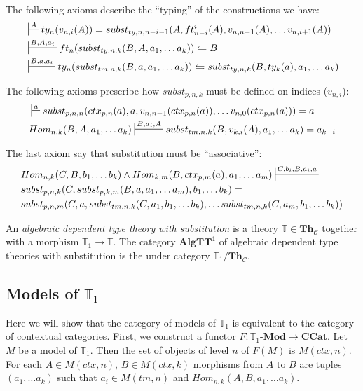 \documentclass{elsarticle}
\theoremstyle{definition}
\theoremstyle{remark}
\newcommand{\cat}[1]{\mathbf{#1}}
\newcommand{\ccat}{\cat{CCat}}
\newcommand{\algtt}{\cat{AlgTT}}
\newcommand{\Mod}[1]{#1\text{-}\cat{Mod}}
\newcommand{\Th}{\cat{Th}}
\newcommand{\ThC}{\Th_{\mathcal{C}}}
\numberwithin{figure}{section}
\begin{document}
The following axioms describe the ``typing'' of the constructions we have:
\begin{align}
\label{ax:type-var}
& \sststile{}{A}         ty_n(v_{n,i}(A)) = subst_{ty,n,n-i-1}(A, ft^i_{n-i}(A), v_{n,n-1}(A), \ldots v_{n,i+1}(A)) \\
\label{ax:type-subst-ty}
& \sststile{}{B, A, a_i} ft_n(subst_{ty,n,k}(B, A, a_1, \ldots a_k)) \leftrightharpoons B \\
\label{ax:type-subst-tm}
& \sststile{}{B, a, a_i} ty_n(subst_{tm,n,k}(B, a, a_1, \ldots a_k)) \leftrightharpoons subst_{ty,n,k}(B, ty_k(a), a_1, \ldots a_k)
\end{align}

The following axioms prescribe how $subst_{p,n,k}$ must be defined on indices ($v_{n,i}$):
\begin{align}
\label{ax:subst-var}
& \sststile{}{a}         subst_{p,n,n}(ctx_{p,n}(a), a, v_{n,n-1}(ctx_{p,n}(a)), \ldots v_{n,0}(ctx_{p,n}(a))) = a \\
\label{ax:var-subst}
& Hom_{n,k}(B, A, a_1, \ldots a_k) \sststile{}{B, a_i, A} subst_{tm,n,k}(B, v_{k,i}(A), a_1, \ldots a_k) = a_{k-i}
\end{align}

The last axiom say that substitution must be ``associative'':
\begin{align}
\label{ax:subst-subst}
& Hom_{n,k}(C, B, b_1, \ldots b_k) \land Hom_{k,m}(B, ctx_{p,m}(a), a_1, \ldots a_m) \sststile{}{C, b_i, B, a_i, a} \\ \notag
& subst_{p,n,k}(C, subst_{p,k,m}(B, a, a_1, \ldots a_m), b_1, \ldots b_k) = \\ \notag
& subst_{p,n,m}(C, a, subst_{tm,n,k}(C, a_1, b_1, \ldots b_k), \ldots subst_{tm,n,k}(C, a_m, b_1, \ldots b_k))
\end{align}

\begin{defn}
An \emph{algebraic dependent type theory with substitution} is a theory $\mathbb{T} \in \ThC$ together with a morphism $\mathbb{T}_1 \to \mathbb{T}$.
The category $\algtt^1$ of algebraic dependent type theories with substitution is the under category $\mathbb{T}_1/\ThC$.
\end{defn}

\subsection{Models of $\mathbb{T}_1$}

Here we will show that the category of models of $\mathbb{T}_1$ is equivalent to the category of contextual categories.
First, we construct a functor $F : \Mod{\mathbb{T}_1} \to \ccat$.
Let $M$ be a model of $\mathbb{T}_1$.
Then the set of objects of level $n$ of $F(M)$ is $M(ctx,n)$.
For each $A \in M(ctx,n)$, $B \in M(ctx,k)$ morphisms from $A$ to $B$ are tuples $(a_1, \ldots a_k)$ such that $a_i \in M(tm,n)$ and $Hom_{n,k}(A, B, a_1, \ldots a_k)$.
\end{document}
